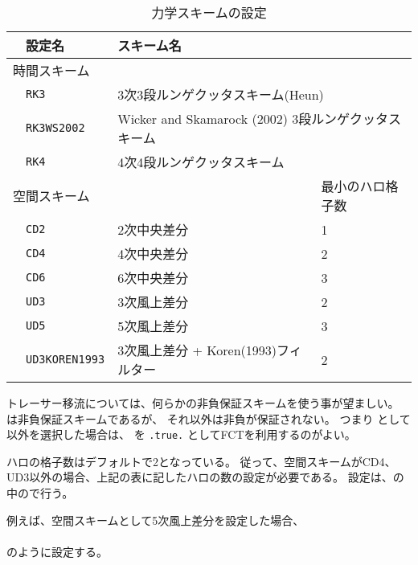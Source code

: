 \begin{table}[h]
\begin{center}
  \caption{力学スキームの設定}
  \label{tab:nml_atm_dyn}
  \begin{tabularx}{150mm}{llXX} \hline
    \rowcolor[gray]{0.9} & \multicolumn{1}{l}{設定名} & \multicolumn{1}{l}{スキーム名} & \\ \hline
    \multicolumn{3}{l}{時間スキーム} &  \\ \hline
    & \multicolumn{1}{l}{\verb|RK3|} & \multicolumn{2}{l}{3次3段ルンゲクッタスキーム(Heun)} \\
    & \multicolumn{1}{l}{\verb|RK3WS2002|} & \multicolumn{2}{l}{Wicker and Skamarock (2002) 3段ルンゲクッタスキーム} \\
    & \multicolumn{1}{l}{\verb|RK4|} & \multicolumn{2}{l}{4次4段ルンゲクッタスキーム} \\
    \hline
    \multicolumn{3}{l}{空間スキーム} & 最小のハロ格子数\\ \hline
    & \multicolumn{1}{l}{\verb|CD2|} & \multicolumn{1}{l}{2次中央差分} & \multicolumn{1}{l}{1}\\
    & \multicolumn{1}{l}{\verb|CD4|} & \multicolumn{1}{l}{4次中央差分} & \multicolumn{1}{l}{2}\\
    & \multicolumn{1}{l}{\verb|CD6|} & \multicolumn{1}{l}{6次中央差分} & \multicolumn{1}{l}{3}\\
    & \multicolumn{1}{l}{\verb|UD3|} & \multicolumn{1}{l}{3次風上差分} & \multicolumn{1}{l}{2}\\
    & \multicolumn{1}{l}{\verb|UD5|} & \multicolumn{1}{l}{5次風上差分} & \multicolumn{1}{l}{3}\\
    & \multicolumn{1}{l}{\verb|UD3KOREN1993|} & \multicolumn{1}{X}{3次風上差分 + Koren(1993)フィルター} & \multicolumn{1}{l}{2}\\
\hline
  \end{tabularx}
\end{center}
\end{table}

トレーサー移流については、何らかの非負保証スキームを使う事が望ましい。
は非負保証スキームであるが、
それ以外は非負が保証されない。
つまり として 以外を選択した場合は、
 を \verb|.true.| としてFCTを利用するのがよい。

ハロの格子数はデフォルトで2となっている。
従って、空間スキームがCD4、UD3以外の場合、上記の表に記したハロの数の設定が必要である。
設定は、の中ので行う。

例えば、空間スキームとして5次風上差分を設定した場合、\\

\\

のように設定する。
